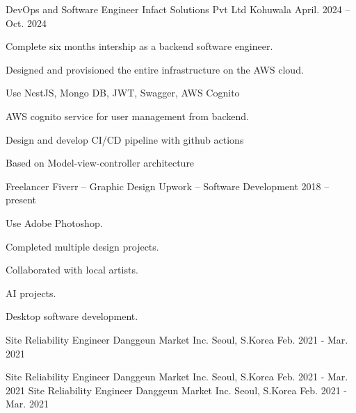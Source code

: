 

\begin{cventries}

  \cventry
    {DevOps and Software Engineer} %
    {Infact Solutions Pvt Ltd} %
    {Kohuwala} %
    {April. 2024 -- Oct. 2024} %

    {
      \begin{cvitems} %
        \item {Complete six months intership as a backend software engineer.}
        \item {Designed and provisioned the entire infrastructure on the AWS cloud.}
        \item {Use NestJS, Mongo DB, JWT, Swagger, AWS Cognito}
        \item {AWS cognito service for user management from backend.}
        \item {Design and develop CI/CD pipeline with github actions}
        \item {Based on Model-view-controller architecture}
      \end{cvitems}
    }

  \cventry
    {Freelancer} %
    {Fiverr -- Graphic Design} %
    {Upwork -- Software Development} %
    {2018 -- present} %
    {
      \begin{cvitems} %
        \item {Use Adobe Photoshop.}
        \item {Completed multiple design projects.}
        \item {Collaborated with local artists.}
        \item {AI projects.}
        \item {Desktop software development.}
      \end{cvitems}
    }

  \cventry
    {Site Reliability Engineer} %
    {Danggeun Market Inc.} %
    {Seoul, S.Korea} %
    {Feb. 2021 - Mar. 2021} %
    {
    }

  \cventry
    {Site Reliability Engineer} %
    {Danggeun Market Inc.} %
    {Seoul, S.Korea} %
    {Feb. 2021 - Mar. 2021} %
    {
    }
\cventry
    {Site Reliability Engineer} %
    {Danggeun Market Inc.} %
    {Seoul, S.Korea} %
    {Feb. 2021 - Mar. 2021} %
    {
    }


\end{cventries}
